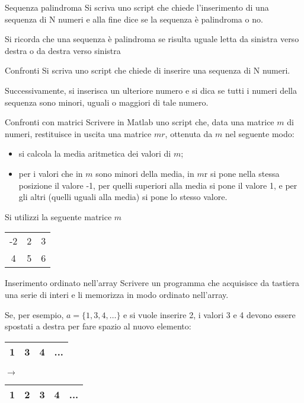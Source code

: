 \documentclass[format=169, handout]{beamer}
\begin{document}
\begin{frame}{Sequenza palindroma}
Si scriva uno script che chiede l’inserimento di una sequenza di N numeri e alla fine dice se la sequenza è palindroma o no.

Si ricorda che una sequenza è palindroma se risulta uguale letta da sinistra verso destra o da destra verso sinistra
\end{frame}

\begin{frame}{Confronti}
Si scriva uno script che chiede di inserire una sequenza di N numeri.

Successivamente, si inserisca un ulteriore numero e si dica se tutti i numeri della sequenza sono minori, uguali o maggiori di tale numero.
\end{frame}

\begin{frame}{Confronti con matrici}
Scrivere in Matlab uno script che, data una matrice $m$ di numeri, restituisce in uscita una matrice $mr$, ottenuta da $m$ nel seguente modo:
\begin{itemize}
	\item si calcola la media aritmetica dei valori di $m$;
	\item per i valori che in $m$ sono minori della media, in $m$r si
pone nella stessa posizione il valore -1, per quelli superiori alla media si pone il valore 1, e per gli altri (quelli uguali alla media) si pone lo stesso valore.
\end{itemize}

Si utilizzi la seguente matrice $m$

\centering
\begin{tabular}{|ccc|}
	\hline
	-2&2&3\\
	4&5&6\\
	\hline
\end{tabular}
\end{frame}

\begin{frame}{Inserimento ordinato nell'array}
Scrivere un programma che acquisisce da tastiera una serie di interi e li memorizza in modo ordinato nell'array.

\pause
Se, per esempio, $a = \{1, 3, 4, …\}$ e si vuole inserire 2, i valori 3 e 4 devono essere spostati a destra per fare spazio al nuovo elemento:

\centering
\begin{tabular}{|c|c|c|c|}
	\hline
	1&3&4&...\\
	\hline
\end{tabular}
$\rightarrow$
\begin{tabular}{|c|c|c|c|c|}
	\hline
	1& \alert{2} &3&4&...\\
	\hline
\end{tabular}

\end{frame}
\end{document}

